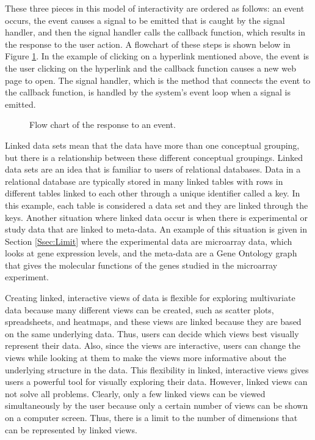 \documentclass{article}[11pt]
\begin{document}
These three pieces in this model of interactivity are ordered as follows:
an event occurs, the event causes a signal to be emitted that is caught by the
signal handler, and then the signal handler calls the callback function, which
results in the response to the user action.  A flowchart of these steps is
shown below in Figure \ref{Fig:Event}.  In the example of clicking on a
hyperlink mentioned above, the event is the user clicking on the
hyperlink and the callback function causes a new web page to open.
The signal handler, which is the method that connects the event to the
callback function, is handled by the system's event loop when a signal is
emitted. 

\begin{figure}[!h]
  \begin{center}    
    \caption{ Flow chart of the response to an event. }
    \label{Fig:Event}
  \end{center}
\end{figure}

Linked data sets mean that the data have more than one conceptual grouping,
but there is a relationship between these different conceptual groupings.
Linked data sets are an idea that is familiar to users of relational
databases.  Data in a relational database are typically stored in many
linked tables with rows in different tables linked to each other through a
unique identifier called a key.  In this example, each table is
considered a data set and they are linked through the keys.  Another situation
where linked data occur is when there is experimental or study data that
are linked to meta-data.  An example of this situation is given in Section
\ref{Ssec:Limit} where the experimental data are microarray data, which looks
at gene expression levels, and the meta-data are a Gene Ontology graph that
gives the molecular functions of the genes studied in the microarray
experiment.  

Creating linked, interactive views of data is flexible for exploring
multivariate data because many different views can be created, such as
scatter plots, spreadsheets, and heatmaps, and these views are linked because
they are based on the same underlying data.  Thus, users can decide which
views best visually represent their data.  Also, since the views are
interactive, users can change the views while looking at them to make the
views more informative about the underlying structure in the data.  This
flexibility in linked, interactive views gives users a powerful tool for
visually exploring their data.  However, linked views can not solve all
problems.  Clearly, only a few linked views can be viewed simultaneously by
the user because only a certain number of views can be shown on a computer
screen.  Thus, there is a limit to the number of dimensions that can be
represented by linked views. 
\end{document}
